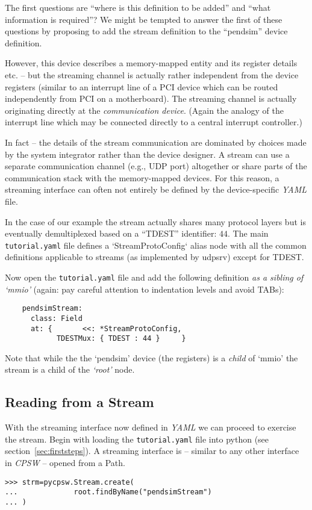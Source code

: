 \documentclass[10pt]{article}
\newcommand{\ita}[1]{\emph{#1}}
\newcommand{\cpsw}      {\ita {CPSW}}
\newcommand{\yaml}      {\ita {YAML}}
\newcommand{\Path}      {{Path}}
\newcommand{\py}        {python}
\newcommand{\udps}      {udpsrv}
\newcommand{\cod}[1] {{\tt#1}}
\newcommand{\tutyaml} {\cod{tutorial.yaml}}
\begin{document}
The first questions are ``where is this definition to be added'' and ``what
information is required''? We might be tempted to answer the first of these questions
by proposing to add the stream definition to the ``pendsim'' device definition.

However, this device describes a memory-mapped entity and its register details
etc. -- but the streaming channel is actually rather independent from the device
registers (similar to an interrupt line of a PCI device which can be routed
independently from PCI on a motherboard). The streaming channel is actually
originating directly at the {\em communication device}. (Again the analogy of
the interrupt line which may be connected directly to a central interrupt controller.)

In fact -- the details of the stream communication are dominated by choices made
by the system integrator rather than the device designer. A stream can use a separate
communication channel (e.g., UDP port) altogether or share parts of the communication
stack with the memory-mapped devices. For this reason, a streaming interface can
often not entirely be defined by the device-specific \yaml{} file.

In the case of our example the stream actually shares many protocol layers but
is eventually demultiplexed based on a ``TDEST'' identifier: $44$. The main \tutyaml{}
file defines a `StreamProtoConfig` alias node with all the common definitions
applicable to streams (as implemented by \udps{}) except for TDEST.

Now open the \tutyaml{} file and add the following definition {\em as a sibling of
`mmio'} (again: pay careful attention to indentation levels and avoid TABs):
\begin{verbatim}
    pendsimStream:
      class: Field
      at: {       <<: *StreamProtoConfig,
            TDESTMux: { TDEST : 44 }     }
\end{verbatim}

Note that while the the `pendsim' device (the registers) is
a {\em child} of `mmio' the stream is a child of the {\em `root'}
node.

\subsection{Reading from a Stream}
With the streaming interface now defined in \yaml{} we can proceed to exercise
the stream.  Begin with loading the \tutyaml{} file into \py{} (see
section~\ref{sec:firststeps}).  A streaming interface is -- similar to any other interface
in \cpsw{} -- opened from a \Path{}.
\begin{verbatim}
>>> strm=pycpsw.Stream.create(
...             root.findByName("pendsimStream")
... )
\end{verbatim}
\end{document}
